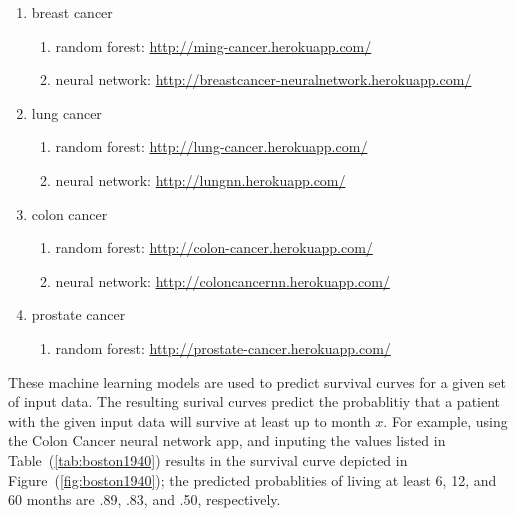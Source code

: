 \documentclass[a4paper,11pt]{article}
\begin{document}
\begin{enumerate}[noitemsep]
\item breast cancer 
    \begin{enumerate}[noitemsep]
    \item random forest: \url{http://ming-cancer.herokuapp.com/}
    \item neural network: \url{http://breastcancer-neuralnetwork.herokuapp.com/}
    \end{enumerate}
\item lung cancer
   \begin{enumerate}[noitemsep]
   \item random forest: \url{http://lung-cancer.herokuapp.com/}
   \item neural network: \url{http://lungnn.herokuapp.com/}
    \end{enumerate}
\item colon cancer
  \begin{enumerate}[noitemsep]
   \item random forest: \url{http://colon-cancer.herokuapp.com/}
   \item neural network: \url{http://coloncancernn.herokuapp.com/}
   \end{enumerate}
\item prostate cancer
  \begin{enumerate}[noitemsep]
   \item random forest: \url{http://prostate-cancer.herokuapp.com/}
   \end{enumerate}
\end{enumerate}





These machine learning models are used to predict survival curves for a given set of input data. 
The resulting surival curves predict the probablitiy that a patient with the given input data will survive at least up to month $x$. For example, using the Colon Cancer neural network app, and 
inputing the values listed in Table~(\ref{tab:boston1940}) results in the survival curve depicted in Figure~(\ref{fig:boston1940}); the predicted probablities of living 
at least 6, 12, and 60 months are .89, .83, and .50, respectively.
\end{document}
